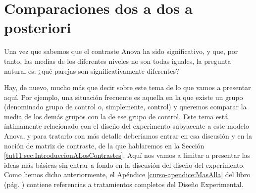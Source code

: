 \documentclass[10pt,a4paper]{article}\usepackage[]{graphicx}\usepackage[]{color}
\newcounter {cont01}
\begin{document}
\section{Comparaciones dos a dos a posteriori}
\label{tut11:sec:ComparacionesDosaDos}

 Una vez que sabemos que el contraste Anova ha sido significativo, y que, por tanto, las medias de los diferentes niveles no son todas iguales, la pregunta natural es: ¿qué parejas son significativamente diferentes?

Hay, de nuevo, mucho más que decir sobre este tema de lo que vamos a presentar aquí. Por ejemplo,
una situación frecuente es aquella en la que existe un grupo (denominado {\sf grupo de control} o,
simplemente, {\sf control}) y queremos comparar la media de los demás grupos con la de ese grupo de
control. Este tema está íntimamente relacionado con el diseño del experimento subyacente a este
modelo Anova, y para tratarlo con más detalle deberíamos entrar en esa discusión y en la noción de
{\sf matriz de contraste}, de la que hablaremos en la Sección \ref{tut11:sec:IntroduccionALosContrastes}. Aquí nos vamos a limitar a presentar las ideas más básicas sin entrar a fondo en la discusión del diseño del experimento. Como hemos dicho anteriormente, el Apéndice \ref{curso-apendice:MasAlla} del libro (pág. \pageref{curso-apendice:MasAlla}) contiene referencias a tratamientos completos del Diseño Experimental.
\end{document}
